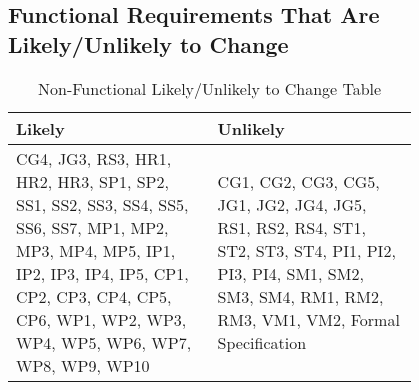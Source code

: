 \documentclass[12pt]{article}
\begin{document}
\subsection{Functional Requirements That Are Likely/Unlikely to Change}
\begin{table}[h]
    \centering
    \begin{tabular}{|p{0.40\linewidth} | p{0.40\linewidth}|}
    \hline
         Likely & Unlikely \\
         \hline
         CG4, JG3, RS3, HR1, HR2, HR3, SP1, SP2, SS1, SS2, SS3, SS4, SS5, SS6, SS7, MP1, MP2, MP3, MP4, MP5, IP1, IP2, IP3, IP4, IP5, CP1, CP2, CP3, CP4, CP5, CP6, WP1, WP2, WP3, WP4, WP5, WP6, WP7, WP8, WP9, WP10 & CG1, CG2, CG3, CG5, JG1, JG2, JG4, JG5, RS1, RS2, RS4, ST1, ST2, ST3, ST4, PI1, PI2, PI3, PI4, SM1, SM2, SM3, SM4, RM1, RM2, RM3, VM1, VM2, Formal Specification   \\
         \hline
    \end{tabular}
    \caption{Non-Functional Likely/Unlikely to Change Table}
    \label{tab:my_label2}
\end{table}
\end{document}

